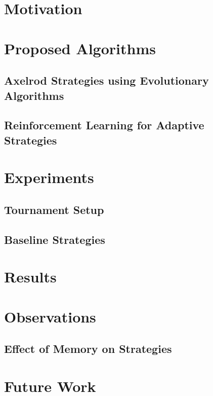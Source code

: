 \documentclass[a4paper]{article}
\begin{document}
	\section{Motivation}
	
	\section{Proposed Algorithms}
	
	\subsection{Axelrod Strategies using Evolutionary Algorithms}

	\subsection{Reinforcement Learning for Adaptive Strategies}
	
	\section{Experiments}
	
	\subsection{Tournament Setup}
	
	\subsection{Baseline Strategies}

	\section{Results}
	
	\section{Observations}
	
	\subsection{Effect of Memory on Strategies}	
		
	\section{Future Work}
			
\end{document}
